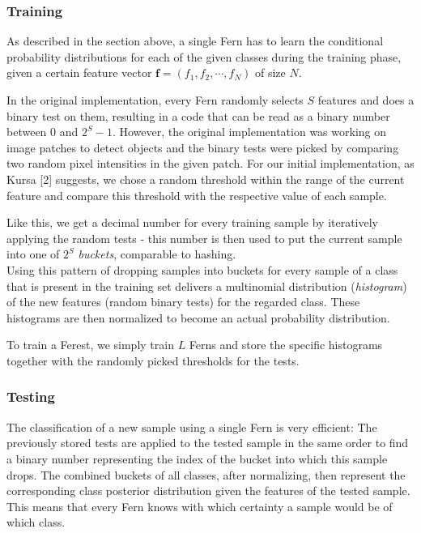 \documentclass[twocolumn]{article}
\begin{document}
\subsubsection{Training}

As described in the section above, a single Fern has to learn the conditional probability distributions for each of the given classes during the training phase, given a certain feature vector $\mathbf{f} = (f_1,f_2, \cdots, f_N)$ of size $N$.

In the original implementation, every Fern randomly selects $S$ features and does a binary test on them, resulting in a code that can be read as a binary number between $0$ and $2^S-1$. However, the original implementation was working on image patches to detect objects and the binary tests were picked by comparing two random pixel intensities in the given patch. For our initial implementation, as Kursa [2] suggests, we chose a random threshold within the range of the current feature and compare this threshold with the respective value of each sample.

Like this, we get a decimal number for every training sample by iteratively applying the random tests - this number is then used to put the current sample into one of $2^S$ \textit{buckets}, comparable to hashing.\\
Using this pattern of dropping samples into buckets for every sample of a class that is present in the training set delivers a multinomial distribution (\textit{histogram}) of the new features (random binary tests) for the regarded class. These histograms are then normalized to become an actual probability distribution.

To train a Ferest, we simply train $L$ Ferns and store the specific histograms together with the randomly picked thresholds for the tests.

\subsubsection{Testing}

The classification of a new sample using a single Fern is very efficient: The previously stored tests are applied to the tested sample in the same order to find a binary number representing the index of the bucket into which this sample drops. The combined buckets of all classes, after normalizing, then represent the corresponding class posterior distribution given the features of the tested sample. This means that every Fern knows with which certainty a sample would be of which class.
\end{document}
